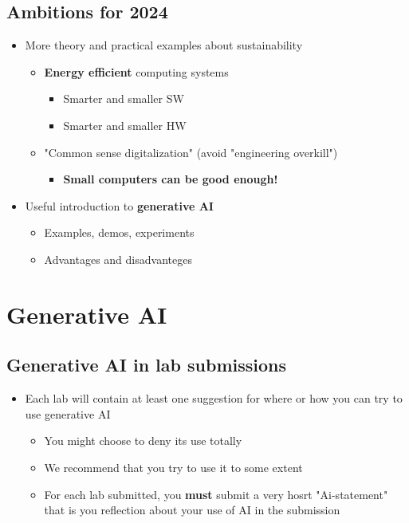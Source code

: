 \documentclass[a4paper,11pt,norsk]{article}
\begin{document}
\subsection{Ambitions for 2024}
\begin{itemize}
    \item More theory and practical examples about sustainability
        \begin{itemize}
            \item \textbf{Energy efficient} computing systems
                \begin{itemize}
                    \item Smarter and smaller SW
                    \item Smarter and smaller HW
                \end{itemize}
            \item "Common sense digitalization" (avoid "engineering overkill")
                \begin{itemize}
                    \item \textbf{Small computers can be good enough!}
                \end{itemize}
        \end{itemize}
    \item Useful introduction to \textbf{generative AI}
        \begin{itemize}
            \item Examples, demos, experiments
            \item Advantages and disadvanteges
        \end{itemize}
\end{itemize}

\section{Generative AI}
\subsection{Generative AI in lab submissions}
\begin{itemize}
    \item Each lab will contain at least one suggestion for where or how you can try to use generative AI
        \begin{itemize}
            \item You might choose to deny its use totally
            \item We recommend that you try to use it to some extent
            \item For each lab submitted, you \textbf{must} submit a very hosrt "Ai-statement" that is you reflection about your use of AI in the submission
        \end{itemize}
\end{itemize}
\end{document}

